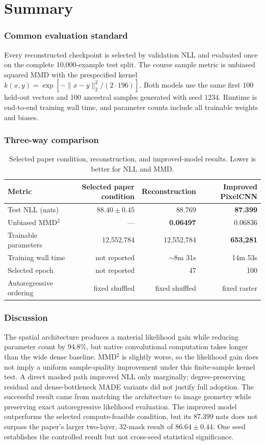 \documentclass[11pt]{article}
\begin{document}
\part{Summary}
\setcounter{section}{0}

\section{Common evaluation standard}
Every reconstructed checkpoint is selected by validation NLL and evaluated once
on the complete 10,000-example test split. The course sample metric is unbiased
squared MMD with the prespecified kernel
$k(x,y)=\exp[-\lVert x-y\rVert_2^2/(2\cdot196)]$. Both models use the same first
100 held-out vectors and 100 ancestral samples generated with seed 1234. Runtime
is end-to-end training wall time, and parameter counts include all trainable
weights and biases.

\section{Three-way comparison}
\begin{table}[H]
\centering
\caption{Selected paper condition, reconstruction, and improved-model results.
Lower is better for NLL and MMD.}
\label{tab:three-way}
\begin{tabular}{@{}lrrr@{}}
\toprule
Metric & Selected paper condition & Reconstruction & Improved PixelCNN \\
\midrule
Test NLL (nats) & $88.40\pm0.45$ & 88.769 & \textbf{87.399} \\
Unbiased MMD$^2$ & --- & \textbf{0.06497} & 0.06836 \\
Trainable parameters & 12,552,784 & 12,552,784 & \textbf{653,281} \\
Training wall time & not reported & $\sim$8m 31s & 14m 53s \\
Selected epoch & not reported & 47 & 100 \\
Autoregressive ordering & fixed shuffled & fixed shuffled & fixed raster \\
\bottomrule
\end{tabular}
\end{table}

\section{Discussion}
The spatial architecture produces a material likelihood gain while reducing
parameter count by 94.8\%, but native convolutional computation takes longer
than the wide dense baseline. MMD$^2$ is slightly worse, so the likelihood gain
does not imply a uniform sample-quality improvement under this finite-sample
kernel test. A direct masked path improved NLL only marginally;
degree-preserving residual and dense-bottleneck MADE variants did not justify
full adoption. The successful result came from matching the architecture to
image geometry while preserving exact autoregressive likelihood evaluation.
The improved model outperforms the selected compute-feasible condition, but its
87.399 nats does not surpass the paper's larger two-layer, 32-mask result of
$86.64\pm0.44$. One seed establishes the controlled result but not cross-seed
statistical significance.

\clearpage
\begingroup
\small
\setlength{\bibsep}{3pt}


\endgroup
\end{document}
